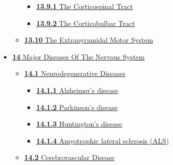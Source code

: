 \begin{itemize}
\begin{itemize}
    \begin{itemize}
    \tightlist
    \item
      \href{the-somatic-motor-system.html\#the-corticospinal-tract-1}{\emph{}\textbf{13.9.1}
      The Corticospinal Tract}
    \item
      \href{the-somatic-motor-system.html\#the-corticobulbar-tract-1}{\emph{}\textbf{13.9.2}
      The Corticobulbar Tract}
    \end{itemize}
  \item
    \href{the-somatic-motor-system.html\#the-extrapyramidal-motor-system}{\emph{}\textbf{13.10}
    The Extrapyramidal Motor System}
  \end{itemize}
\item
  \href{major-diseases-of-the-nervous-system.html}{\emph{}\textbf{14}
  Major Diseases Of The Nervous System}

  \begin{itemize}
  \tightlist
  \item
    \href{major-diseases-of-the-nervous-system.html\#neurodegenerative-diseases}{\emph{}\textbf{14.1}
    Neurodegenerative Diseases}

    \begin{itemize}
    \tightlist
    \item
      \href{major-diseases-of-the-nervous-system.html\#alzheimers-disease}{\emph{}\textbf{14.1.1}
      Alzheimer's disease}
    \item
      \href{major-diseases-of-the-nervous-system.html\#parkinsons-disease}{\emph{}\textbf{14.1.2}
      Parkinson's disease}
    \item
      \href{major-diseases-of-the-nervous-system.html\#huntingtons-disease}{\emph{}\textbf{14.1.3}
      Huntington's disease}
    \item
      \href{major-diseases-of-the-nervous-system.html\#amyotrophic-lateral-sclerosis-als}{\emph{}\textbf{14.1.4}
      Amyotrophic lateral sclerosis (ALS)}
    \end{itemize}
  \item
    \href{major-diseases-of-the-nervous-system.html\#cerebrovascular-disease}{\emph{}\textbf{14.2}
    Cerebrovascular Disease}


\end{itemize}
\end{itemize}
